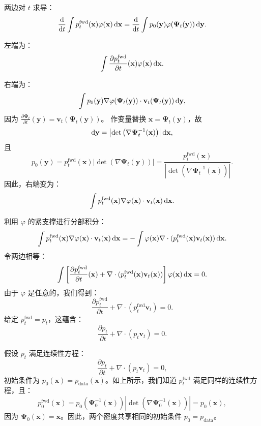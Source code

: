 两边对 $ t $ 求导：
\[
\frac{\mathop{}\!\mathrm{d}}{\mathop{}\!\mathrm{d} t} \int p_t^{\mathrm{fwd}}(\mathbf{x}) \varphi(\mathbf{x}) \mathop{}\!\mathrm{d}\mathbf{x} = \frac{\mathop{}\!\mathrm{d}}{\mathop{}\!\mathrm{d} t} \int p_0(\mathbf{y}) \varphi(\bm{\Psi}_t(\mathbf{y})) \mathop{}\!\mathrm{d}\mathbf{y}.
\]

左端为：
\[
\int \frac{\partial p_t^{\mathrm{fwd}}}{\partial t}(\mathbf{x}) \varphi(\mathbf{x}) \mathop{}\!\mathrm{d}\mathbf{x}.
\]

右端为：
\[
\int p_0(\mathbf{y}) \nabla \varphi(\bm{\Psi}_t(\mathbf{y})) \cdot \mathbf{v}_t(\bm{\Psi}_t(\mathbf{y})) \mathop{}\!\mathrm{d}\mathbf{y},
\]
因为 $ \frac{\partial \bm{\Psi}_t}{\partial t}(\mathbf{y}) = \mathbf{v}_t(\bm{\Psi}_t(\mathbf{y})) $。
作变量替换 $ \mathbf{x} = \bm{\Psi}_t(\mathbf{y}) $，故
\[
\mathop{}\!\mathrm{d}\mathbf{y} = \left| \det\left( \nabla \bm{\Psi}_t^{-1}(\mathbf{x}) \right) \right| \mathop{}\!\mathrm{d}\mathbf{x} ,
\]
且
\[
p_0(\mathbf{y}) = p_t^{\mathrm{fwd}}(\mathbf{x}) \left| \det\left( \nabla \bm{\Psi}_t(\mathbf{y}) \right) \right| = \frac{p_t^{\mathrm{fwd}}(\mathbf{x})}{\left| \det\left( \nabla \bm{\Psi}_t^{-1}(\mathbf{x}) \right) \right|}.
\]
因此，右端变为：
\[
\int p_t^{\mathrm{fwd}}(\mathbf{x}) \nabla \varphi(\mathbf{x}) \cdot \mathbf{v}_t(\mathbf{x}) \mathop{}\!\mathrm{d}\mathbf{x}.
\]

利用 $ \varphi $ 的紧支撑进行分部积分：
\[
\int p_t^{\mathrm{fwd}}(\mathbf{x}) \nabla \varphi(\mathbf{x}) \cdot \mathbf{v}_t(\mathbf{x}) \mathop{}\!\mathrm{d}\mathbf{x} = -\int \varphi(\mathbf{x}) \nabla \cdot (p_t^{\mathrm{fwd}}(\mathbf{x}) \mathbf{v}_t(\mathbf{x})) \mathop{}\!\mathrm{d}\mathbf{x}.
\]
令两边相等：
\[
\int \left[ \frac{\partial p_t^{\mathrm{fwd}}}{\partial t}(\mathbf{x}) + \nabla \cdot (p_t^{\mathrm{fwd}}(\mathbf{x}) \mathbf{v}_t(\mathbf{x})) \right] \varphi(\mathbf{x}) \mathop{}\!\mathrm{d}\mathbf{x} = 0.
\]
由于 $ \varphi $ 是任意的，我们得到：
\[
\frac{\partial p_t^{\mathrm{fwd}}}{\partial t} + \nabla \cdot (p_t^{\mathrm{fwd}} \mathbf{v}_t) = 0.
\]
给定 $ p_t^{\mathrm{fwd}} = p_t $，这蕴含：
\[
\frac{\partial p_t}{\partial t} + \nabla \cdot (p_t \mathbf{v}_t) = 0.
\]


 假设 $ p_t $ 满足连续性方程：
\[
\frac{\partial p_t}{\partial t} + \nabla \cdot (p_t \mathbf{v}_t) = 0,
\]
初始条件为 $ p_0(\mathbf{x}) = p_{\mathrm{data}}(\mathbf{x}) $。如上所示，我们知道 $ p_t^{\mathrm{fwd}} $ 满足同样的连续性方程，且：
\[
p_0^{\mathrm{fwd}}(\mathbf{x}) = p_0(\bm{\Psi}_0^{-1}(\mathbf{x})) \left| \det\left( \nabla \bm{\Psi}_0^{-1}(\mathbf{x}) \right) \right| = p_0(\mathbf{x}),
\]
因为 $ \bm{\Psi}_0(\mathbf{x}) = \mathbf{x} $。因此，两个密度共享相同的初始条件 $ p_0 = p_{\mathrm{data}} $。

